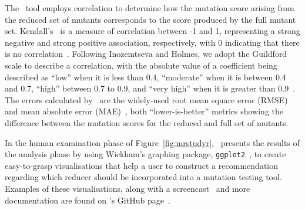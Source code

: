 
The \mr~tool employs correlation to determine how the mutation score arising from the reduced set of mutants corresponds
to the score produced by the full mutant set. Kendall's \taub~is a measure of correlation between -1 and 1, representing
a strong negative and strong positive association, respectively, with 0 indicating that there is no
correlation~\cite{mcleod2015kendall}. Following Inozemtseva and Holmes, we adopt the Guildford scale to describe a
correlation, with the absolute value of a coefficient being described as ``low'' when it is less than 0.4,
``moderate'' when it is between 0.4 and 0.7, ``high'' between 0.7 to 0.9, and ``very high'' when it is greater
than 0.9~\cite{inozemtseva2014coverage}. The errors calculated by \mr~are the widely-used root mean square error
(RMSE) and mean absolute error (MAE)~\cite{chai2014root}, both ``lower-is-better'' metrics showing the difference
between the mutation scores for the reduced and full set of mutants.






In the human examination phase of Figure~\ref{fig:mrstudyr}, \mr~presents the results of the analysis phase by using
Wickham's graphing package, \texttt{ggplot2}~\cite{ggplot2}, to create easy-to-grasp visualisations that help a user
to construct a recommendation regarding which reducer should be incorporated into a mutation testing tool. Examples of
these visualisations, along with a screencast~\cite{asciinema} and more documentation are found on \mr's GitHub
page~\cite{tool}.



